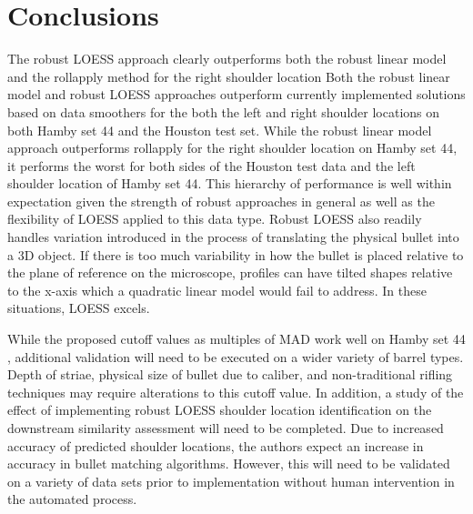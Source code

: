 \documentclass[12pt]{article}
\begin{document}
\section{Conclusions}

The robust LOESS approach clearly outperforms both the robust linear
model and the rollapply method for the right shoulder location Both the
robust linear model and robust LOESS approaches outperform currently
implemented solutions based on data smoothers for the both the left and
right shoulder locations on both Hamby set 44 and the Houston test set.
While the robust linear model approach outperforms rollapply for the
right shoulder location on Hamby set 44, it performs the worst for both
sides of the Houston test data and the left shoulder location of Hamby
set 44. This hierarchy of performance is well within expectation given
the strength of robust approaches in general as well as the flexibility
of LOESS applied to this data type. Robust LOESS also readily handles
variation introduced in the process of translating the physical bullet
into a 3D object. If there is too much variability in how the bullet is
placed relative to the plane of reference on the microscope, profiles
can have tilted shapes relative to the x-axis which a quadratic linear
model would fail to address. In these situations, LOESS excels.

While the proposed cutoff values as multiples of MAD work well on Hamby
set 44 {\color{teal}{and Houston test}}, additional validation will need
to be executed on a wider variety of barrel types. Depth of striae,
physical size of bullet due to caliber, and non-traditional rifling
techniques may require alterations to this cutoff value.
{\color{teal}{LEAs with shoulders which are not aligned horizontally due to tild may also require slight alterations to the method.}}
In addition, a study of the effect of implementing robust LOESS shoulder
location identification on the downstream similarity assessment will
need to be completed. Due to increased accuracy of predicted shoulder
locations, the authors expect an increase in accuracy in bullet matching
algorithms. However, this will need to be validated on a variety of data
sets prior to implementation without human intervention in the automated
process.



\end{document}
